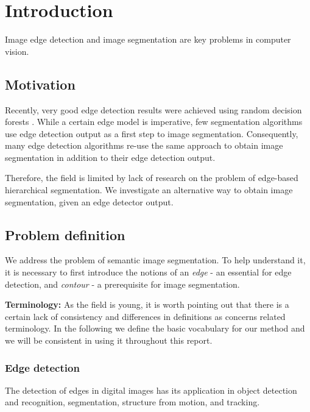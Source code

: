 \chapter{Introduction}
\label{Chapter1}
Image edge detection and image segmentation are key problems in computer vision.

\section{Motivation}
Recently, very good edge detection results were achieved using random decision forests \cite{DollarICCV13edges}. While a certain edge model is imperative, %
few segmentation algorithms use edge detection output as a first step to image segmentation. Consequently, many edge detection algorithms re-use the same approach to obtain image segmentation in addition %
to their edge detection output.

Therefore, the field is limited by lack of research on the problem of edge-based hierarchical segmentation. We investigate an alternative way %
to obtain image segmentation, given an edge detector output.

\section{Problem definition}

We address the problem of semantic image segmentation. To help understand it, it is necessary to first introduce the notions of an {\it edge} - an essential for edge detection, and {\it contour} - a prerequisite for image segmentation.

\textbf{Terminology:} As the field is young, it is worth pointing out that there is a certain lack of consistency and differences in definitions as concerns related terminology. In the following we define the basic vocabulary for our method and we will be consistent in using it throughout this report.

\subsection{Edge detection}
The detection of edges in digital images has its application in %
object detection and recognition, segmentation, structure from motion, and tracking.

